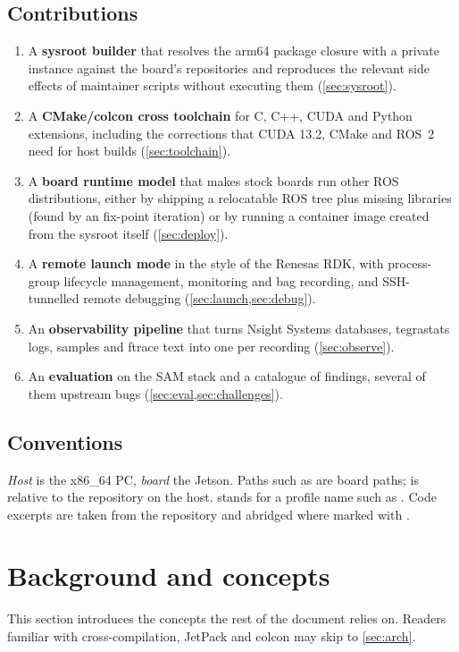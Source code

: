 \documentclass[11pt,a4paper]{article}
\begin{document}
\subsection{Contributions}
\begin{enumerate}
  \item A \textbf{sysroot builder} that resolves the arm64 package closure with a private  instance against
        the board's repositories and reproduces the relevant side effects of maintainer scripts without executing
        them (\cref{sec:sysroot}).
  \item A \textbf{CMake/colcon cross toolchain} for C, C++, CUDA and Python extensions, including the corrections
        that CUDA 13.2, CMake and ROS~2 need for host builds (\cref{sec:toolchain}).
  \item A \textbf{board runtime model} that makes stock boards run other ROS distributions, either by shipping a
        relocatable ROS tree plus missing libraries (found by an  fix-point iteration) or by running a
        container image created from the sysroot itself (\cref{sec:deploy}).
  \item A \textbf{remote launch mode} in the style of the Renesas RDK, with process-group lifecycle management,
        monitoring and bag recording, and SSH-tunnelled remote debugging (\cref{sec:launch,sec:debug}).
  \item An \textbf{observability pipeline} that turns Nsight Systems databases, tegrastats logs, 
        samples and ftrace text into one  per recording (\cref{sec:observe}).
  \item An \textbf{evaluation} on the SAM stack and a catalogue of findings, several of them upstream bugs
        (\cref{sec:eval,sec:challenges}).
\end{enumerate}

\subsection{Conventions}
\emph{Host} is the x86\_64 PC, \emph{board} the Jetson. Paths such as  are board paths;
 is relative to the repository on the host.  stands for a profile name such
as . Code excerpts are taken from the repository and abridged where marked with .

\section{Background and concepts}\label{sec:background}
This section introduces the concepts the rest of the document relies on. Readers familiar with cross-compilation,
JetPack and colcon may skip to \cref{sec:arch}.
\end{document}
